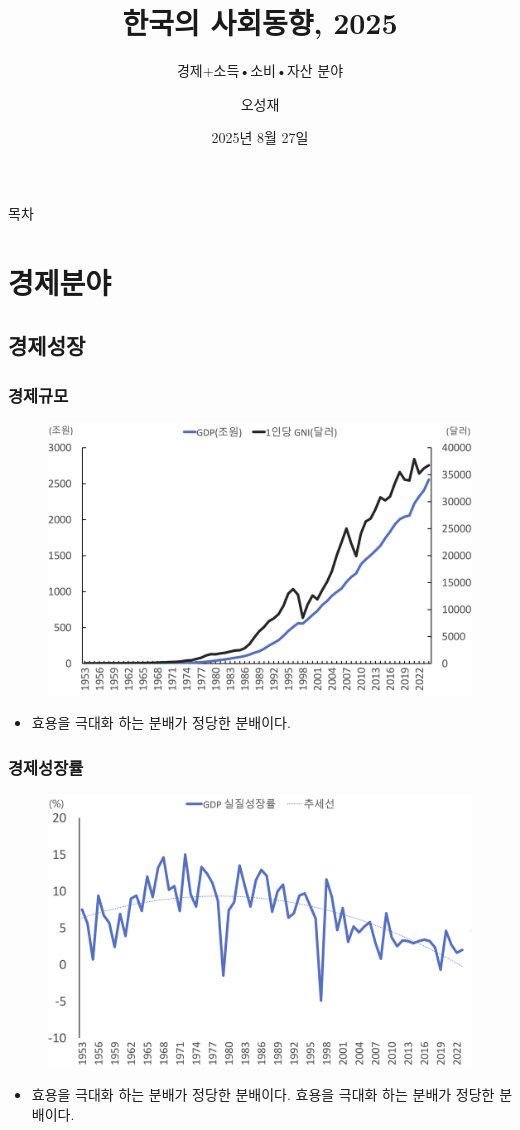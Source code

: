 \documentclass[aspectratio=169,xcolor=dvipsnames,handout]{beamer}
\title{한국의 사회동향, 2025}
\subtitle{경제+소득•소비•자산 분야}
\author{오성재}
\institute[CNU]
    {\relax
        제 5회 한국의 사회동향 포럼
    }
\date{2025년 8월 27일}
\begin{document}

\frame{\titlepage}

\begin{frame}{목차}
    \setcounter{tocdepth}{2}
    \tableofcontents
\end{frame}

\section{경제분야}
\subsection{경제성장}
\begin{frame}[<+->]
\frametitle{경제규모}
    \begin{figure}
        \centering
        \includegraphics[width=.55\textwidth]{pic/fig_econ_01.png}
    \end{figure}
    \begin{itemize}
        \item 효용을 극대화 하는 분배가 정당한 분배이다.
    \end{itemize}
\end{frame}

\begin{frame}[<+->]
\frametitle{경제성장률}
    \begin{figure}
        \centering
        \includegraphics[width=.55\textwidth]{pic/fig_econ_02.png}
    \end{figure}
    \begin{itemize}
        \item 효용을 극대화 하는 분배가 정당한 분배이다. 효용을 극대화 하는 분배가 정당한 분배이다.
    \end{itemize}
\end{frame}
\end{document}
